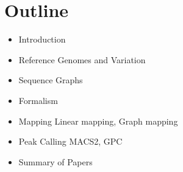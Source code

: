 \section{Outline}
\begin{itemize}
\item Introduction
\item Reference Genomes and Variation
\item Sequence Graphs
\item Formalism
\item Mapping
Linear mapping, Graph mapping
\item Peak Calling
MACS2, GPC
\item Summary of Papers
\end{itemize}